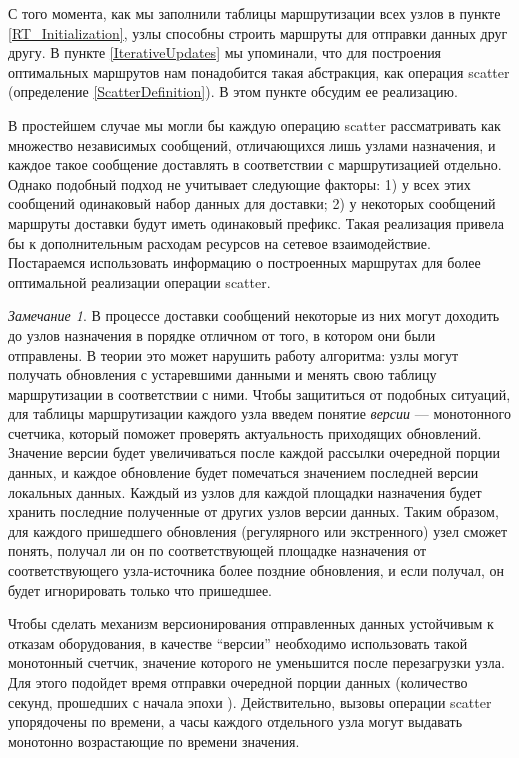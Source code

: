 \documentclass{article}
\theoremstyle{plain}
\theoremstyle{plain}
\theoremstyle{plain}
\theoremstyle{plain}
\theoremstyle{definition}
\theoremstyle{remark}
\newtheorem{remark}{Замечание}[section]
\theoremstyle{plain}
\begin{document}
С того момента, как мы заполнили таблицы маршрутизации всех узлов в пункте \ref{RT_Initialization}, узлы способны строить маршруты для отправки данных друг другу. В пункте \ref{IterativeUpdates} мы упоминали, что для построения оптимальных маршрутов нам понадобится такая абстракция, как операция scatter (определение \ref{ScatterDefinition}). В этом пункте обсудим ее реализацию.

В простейшем случае мы могли бы каждую операцию scatter рассматривать как множество независимых сообщений, отличающихся лишь узлами назначения, и каждое такое сообщение доставлять в соответствии с маршрутизацией отдельно. Однако подобный подход не учитывает следующие факторы: 1) у всех этих сообщений одинаковый набор данных для доставки; 2) у некоторых сообщений маршруты доставки будут иметь одинаковый префикс. Такая реализация привела бы к дополнительным расходам ресурсов на сетевое взаимодействие. Постараемся использовать информацию о построенных маршрутах для более оптимальной реализации операции scatter.

\begin{remark}
\label{message_versions}
    В процессе доставки сообщений некоторые из них могут доходить до узлов назначения в порядке отличном от того, в котором они были отправлены. В теории это может нарушить работу алгоритма: узлы могут получать обновления с устаревшими данными и менять свою таблицу маршрутизации в соответствии с ними. Чтобы защититься от подобных ситуаций, для таблицы маршрутизации каждого узла введем понятие \textit{версии} --- монотонного счетчика, который поможет проверять актуальность приходящих обновлений. Значение версии будет увеличиваться после каждой рассылки очередной порции данных, и каждое обновление будет помечаться значением последней версии локальных данных. Каждый из узлов для каждой площадки назначения будет хранить последние полученные от других узлов версии данных. Таким образом, для каждого пришедшего обновления (регулярного или экстренного) узел сможет понять, получал ли он по соответствующей площадке назначения от соответствующего узла-источника более поздние обновления, и если получал, он будет игнорировать только что пришедшее.
    
    Чтобы сделать механизм версионирования отправленных данных устойчивым к отказам оборудования, в качестве \enquote{версии} необходимо использовать такой монотонный счетчик, значение которого не уменьшится после перезагрузки узла. Для этого подойдет время отправки очередной порции данных (количество секунд, прошедших с начала эпохи \cite{UNIX_timestamp}). Действительно, вызовы операции scatter упорядочены по времени, а часы каждого отдельного узла могут выдавать монотонно возрастающие по времени значения.
\end{remark}
\end{document}
